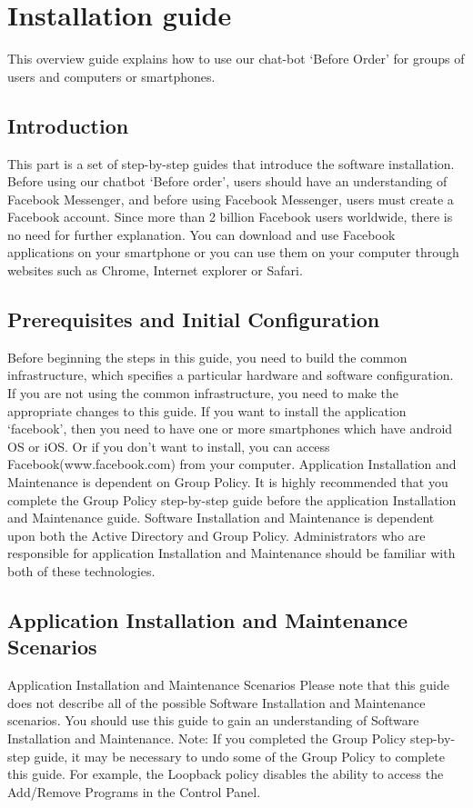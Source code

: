 \section{Installation guide}

This overview guide explains how to use our chat-bot ‘Before Order’ for groups of users and computers or smartphones. \newline

\subsection{Introduction} 
 This part is a set of step-by-step guides that introduce the software installation. Before using our chatbot ‘Before order’, users should have an understanding of Facebook Messenger, and before using Facebook Messenger, users must create a Facebook account. Since more than 2 billion Facebook users worldwide, there is no need for further explanation. You can download and use Facebook applications on your smartphone or you can use them on your computer through websites such as Chrome, Internet explorer or Safari.\newline

\subsection{Prerequisites and Initial Configuration}
 Before beginning the steps in this guide, you need to build the common infrastructure, which specifies a particular hardware and software configuration. If you are not using the common infrastructure, you need to make the appropriate changes to this guide. If you want to install the application ‘facebook’, then you need to have one or more smartphones which have android OS or iOS. Or if you don't want to install, you can access Facebook(www.facebook.com) from your computer. 
 Application Installation and Maintenance is dependent on Group Policy. It is highly recommended that you complete the Group Policy step-by-step guide before the application Installation and Maintenance guide. 
Software Installation and Maintenance is dependent upon both the Active Directory and Group Policy. Administrators who are responsible for application Installation and Maintenance should be familiar with both of these technologies. \newline

\subsection{Application Installation and Maintenance Scenarios}
Application Installation and Maintenance Scenarios 
Please note that this guide does not describe all of the possible Software Installation and Maintenance scenarios. You should use this guide to gain an understanding of Software Installation and Maintenance. 
Note: If you completed the Group Policy step-by-step guide, it may be necessary to undo some of the Group Policy to complete this guide. For example, the Loopback policy disables the ability to access the Add/Remove Programs in the Control Panel.\newline\newline